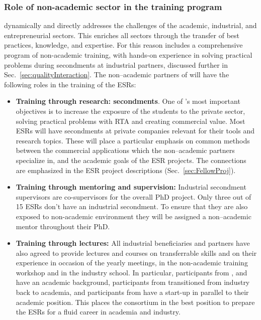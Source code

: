 \subsubsection{Role of non-academic sector in the training program}
\acronym dynamically and directly addresses the challenges of the academic, industrial, and entrepreneurial sectors. 
This enriches all sectors through the transfer of best practices, knowledge, and expertise.
For this reason \acronym includes a comprehensive program of non-academic training, with hands-on experience in solving practical problems during secondments at industrial partners, discussed further in Sec.~\ref{sec:qualityInteraction}.
The non--academic partners of \acronym will have the following roles in the training of the ESRs:
\begin{itemize}
\item \textbf{Training through research: secondments}. One of \acronym's most important objectives is to increase the exposure of the students to the private sector, solving practical problems with RTA and creating commercial value. 
Most ESRs will have secondments at private companies relevant for their tools and research topics.
These will place a particular emphasis on common methods between the commercial applications which the non--academic partners specialize in, and the academic goals of the ESR projects. 
The connections are emphasized in the ESR project descriptions (Sec.~\ref{sec:FellowProj}). 
\item \textbf{Training through mentoring and supervision:} Industrial secondment supervisors are co-supervisors for the overall PhD project. Only three out of 15 ESRs don't have an industrial secondment. To ensure that they are also exposed to non-academic environment they will be assigned a non--academic mentor throughout their PhD.
\item \textbf{Training through lectures: } All industrial beneficiaries and partners have also agreed to provide lectures and courses on transferrable skills and on their experience in occasion of the yearly meetings, in the non-academic training workshop and in the industry school. In particular, participants from \lightboxentity, \pointeightentity and \fleetmaticsentity have an academic background, participants from \uniboentity transitioned from industry back to academia, and participants from \ximantisentity have a start-up in parallel to their academic position. This places the consortium in the best position to prepare the ESRs for a fluid career in academia and industry. 
\end{itemize}

